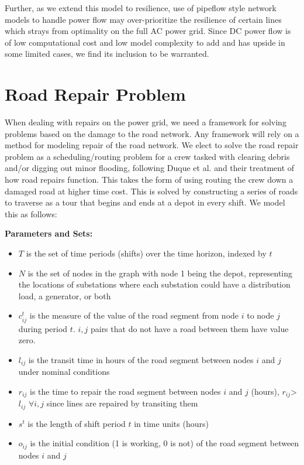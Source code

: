 Further, as we extend this model to resilience, use of pipeflow style network models to handle power flow may over-prioritize the resilience of certain lines which strays from optimality on the full AC power grid. Since DC power flow is of low computational cost and low model complexity to add and has upside in some limited cases, we find its inclusion to be warranted.

\section{Road Repair Problem}
When dealing with repairs on the power grid, we need a framework for solving problems based on the damage to the road network. Any framework will rely on a method for modeling repair of the road network. We elect to solve the road repair problem as a scheduling/routing problem for a crew tasked with clearing debris and/or digging out minor flooding, following Duque et al. \cite{DuqueEA2016} and their treatment of how road repairs function. This takes the form of using routing the crew down a damaged road at higher time cost. This is solved by constructing a series of roads to traverse as a tour that begins and ends at a depot in every shift. We model this as follows:

\textbf{Parameters and Sets:}
\begin{itemize}

\item $T$ is the set of time periods (shifts) over the time horizon, indexed by $t$
\item $N$ is the set of nodes in the graph with node 1 being the depot, representing the locations of substations where each substation could have a distribution load, a generator, or both
\item $c_{ij}^t$ is the measure of the value of the road segment from node $i$ to node $j$ during period $t$. $i,j$ pairs that do not have a road between them have value zero.
\item $l_{ij}$ is the transit time in hours of the road segment between nodes $i$ and $j$ under nominal conditions
\item $r_{ij}$ is the time to repair the road segment between nodes $i$ and $j$ (hours), $r_{ij}$>$l_{ij}$ $\forall i,j$ since lines are repaired by transiting them
\item $s^t$ is the length of shift period $t$ in time units (hours)
\item $o_{ij}$ is the initial condition (1 is working, 0 is not) of the road segment between nodes $i$ and $j$
\end{itemize}

